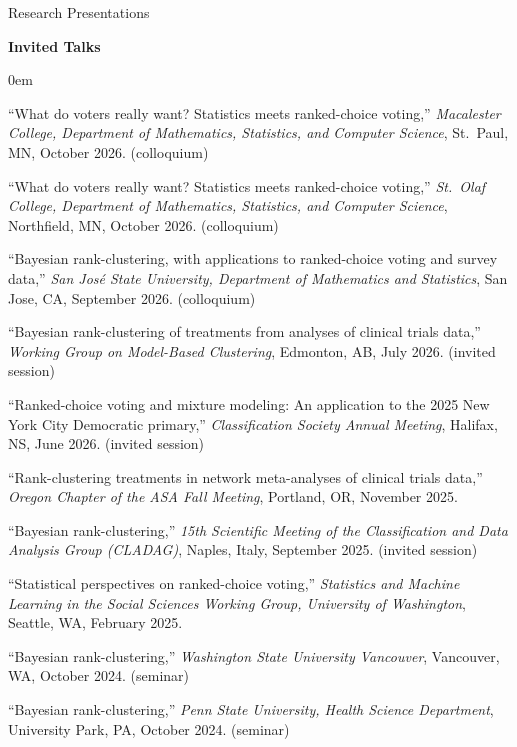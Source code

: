 \documentclass{resume} %
\begin{document}
\begin{rSection}{Research Presentations}

\noindent\textbf{Invited Talks}
\begin{etaremune}
\itemsep0em
\item ``What do voters really want? Statistics meets ranked-choice voting,'' \textit{Macalester College, Department of Mathematics, Statistics, and Computer Science}, St.\ Paul, MN, October 2026. (colloquium)
\item ``What do voters really want? Statistics meets ranked-choice voting,'' \textit{St.\ Olaf College, Department of Mathematics, Statistics, and Computer Science}, Northfield, MN, October 2026. (colloquium)
\item ``Bayesian rank-clustering, with applications to ranked-choice voting and survey data,'' \textit{San Jos\'e State University, Department of Mathematics and Statistics}, San Jose, CA, September 2026. (colloquium)
\item ``Bayesian rank-clustering of treatments from analyses of clinical trials data,'' \textit{Working Group on Model-Based Clustering}, Edmonton, AB, July 2026. (invited session)
\item ``Ranked-choice voting and mixture modeling: An application to the 2025 New York City Democratic primary,'' \textit{Classification Society Annual Meeting}, Halifax, NS, June 2026. (invited session)
\item ``Rank-clustering treatments in network meta-analyses of clinical trials data,'' \textit{Oregon Chapter of the ASA Fall Meeting}, Portland, OR, November 2025.
\item ``Bayesian rank-clustering,'' \textit{15th Scientific Meeting of the Classification and Data Analysis Group (CLADAG)}, Naples, Italy, September 2025. (invited session)
\item ``Statistical perspectives on ranked-choice voting,'' \textit{Statistics and Machine Learning in the Social Sciences Working Group, University of Washington}, Seattle, WA, February 2025.
\item ``Bayesian rank-clustering,'' \textit{Washington State University Vancouver}, Vancouver, WA, October 2024. (seminar)
\item ``Bayesian rank-clustering,'' \textit{Penn State University, Health Science Department}, University Park, PA, October 2024. (seminar)

\end{etaremune}
\end{rSection}
\end{document}
